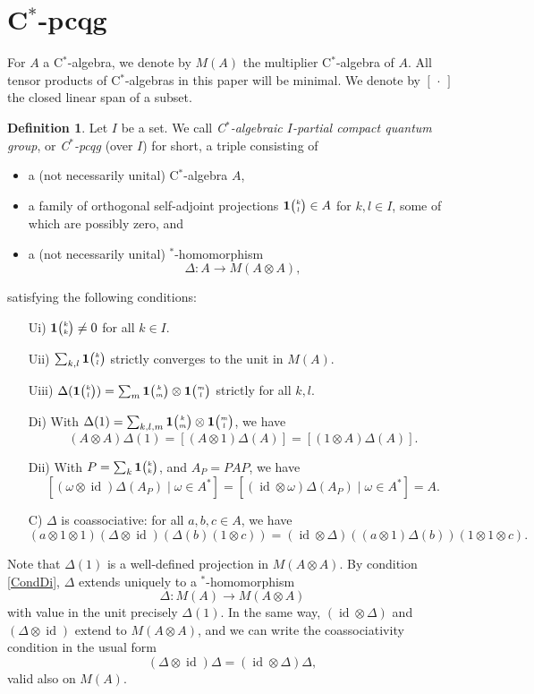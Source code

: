 \documentclass[11pt]{article}
\date{}
\DeclareMathOperator{\id}{id}
\newcommand{\Grt}[3]{#1{\tiny {\begin{pmatrix} #2\\#3\end{pmatrix}}}}
\newcommand{\UnitC}[2]{\Grt{\mathbf{1}}{#1}{#2}}
\theoremstyle{definition}
\newtheorem{Def}[Theorem]{Definition}
\numberwithin{equation}{section}
\begin{document}
\section{C$^*$-pcqg}
For $A$ a C$^*$-algebra, we denote by $M(A)$ the multiplier C$^*$-algebra of $A$. All tensor products of C$^*$-algebras in this paper will be minimal. We denote by $[\,\cdot\,]$ the closed linear span of a subset.

\begin{Def}\label{DefCpcqg} Let $I$ be a set. We call \emph{C$^*$-algebraic $I$-partial compact quantum group}, or \emph{C$^*$-pcqg} (over $I$) for short, a triple consisting of 
\begin{itemize}
\item a (not necessarily unital) C$^*$-algebra $A$,
\item a family of orthogonal self-adjoint projections $\UnitC{k}{l}\in A$ for $k,l\in I$, some of which are possibly zero, and
\item  a (not necessarily unital) $^*$-homomorphism \[\Delta: A\rightarrow M(A\otimes A),\] 
\end{itemize}
satisfying the following conditions:
\begin{enumerate}[(a)]
\item[Ui)] $\UnitC{k}{k}\neq 0$ for all $k\in I$. 
\item[Uii)] $\sum_{k,l} \UnitC{k}{l}$ strictly converges to the unit in $M(A)$.
\item[Uiii)] $\Delta(\UnitC{k}{l}) = \sum_{m}\UnitC{k}{m}\otimes \UnitC{m}{l}$ strictly for all $k,l$. 
\item[Di)] With $\Delta(1) = \sum_{k,l,m} \UnitC{k}{m}\otimes \UnitC{m}{l}$, we have \begin{equation}\label{CondDi}(A\otimes A)\Delta(1) = [(A\otimes 1)\Delta(A)] = [(1\otimes A)\Delta(A)].\end{equation} 
\item[Dii)] With $P=\sum_{k} \UnitC{k}{k}$, and $A_P = PAP$, we have \[[(\omega\otimes \id)\Delta(A_P)\mid \omega \in A^*] = [(\id\otimes \omega)\Delta(A_P)\mid \omega \in A^*] = A.\]
\item[C)] $\Delta$ is coassociative: for all $a,b,c\in A$, we have \[(a\otimes 1\otimes 1)(\Delta\otimes \id)(\Delta(b)(1\otimes c)) = (\id\otimes \Delta)((a\otimes 1)\Delta(b))(1\otimes 1\otimes c).\] 
\end{enumerate}
\end{Def} 

Note that $\Delta(1)$ is a well-defined projection in $M(A\otimes A)$. By condition \eqref{CondDi}, $\Delta$ extends uniquely to a $^*$-homomorphism \[\Delta: M(A)\rightarrow M(A\otimes A)\] with value in the unit precisely $\Delta(1)$. In the same way, $(\id\otimes \Delta)$ and $(\Delta\otimes \id)$ extend to $M(A\otimes A)$, and we can write the coassociativity condition in the usual form \[(\Delta\otimes \id)\Delta = (\id\otimes \Delta)\Delta,\] valid also on $M(A)$.
\end{document}
